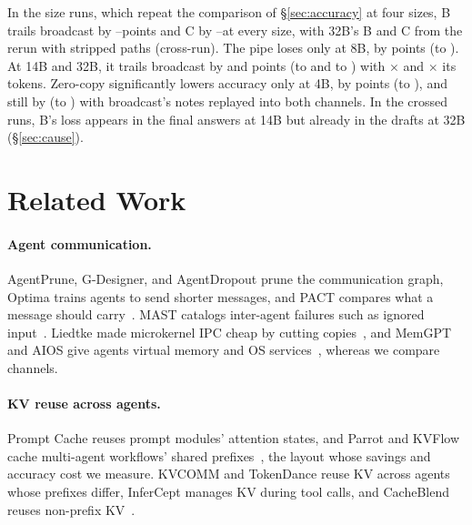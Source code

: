 \documentclass[sigplan,10pt,nonacm,review,anonymous]{acmart}
\begin{document}
In the size runs, which repeat the comparison of \S\ref{sec:accuracy} at four sizes, B trails broadcast by
\nPSizeGapBMin--\nPSizeGapBMax points and C by \nPSizeGapCMin--\nPSizeGapCMax at every size, with 32B's B and
C from the rerun with stripped paths (cross-run). The pipe loses only at 8B, by \nPSizeEightGapATwo points (\nPSizeEightGapATwoLo to
\nPSizeEightGapATwoHi). At 14B and 32B, it trails broadcast by \nPSizeFourteenGapATwo
and \nPSizeThirtyTwoGapATwo points (\nPSizeFourteenGapATwoLo to \nPSizeFourteenGapATwoHi and
\nPSizeThirtyTwoGapATwoLo to \nPSizeThirtyTwoGapATwoHi) with \nRThirteenPipeSentFourteen{}$\times$ and
\nRThirteenPipeSentThirtyTwo{}$\times$ its tokens. Zero-copy significantly lowers accuracy only at 4B,
by \nPSizeFourGapAZc points (\nPSizeFourGapAZcLo to \nPSizeFourGapAZcHi), and still by \nRFourZcReplayFour
(\nRFourZcReplayFourLo to \nRFourZcReplayFourHi) with broadcast's notes replayed into both channels. In the
crossed runs, B's loss appears in the final answers at 14B but already in the drafts at 32B
(\S\ref{sec:cause}).

\section{Related Work}

\paragraph{Agent communication.} AgentPrune, G-Designer, and AgentDropout prune the communication graph,
Optima trains agents to send shorter messages, and PACT compares what a message should
carry~\cite{agentprune,gdesigner,agentdropout,optima,pact}. MAST catalogs inter-agent failures such as ignored
input~\cite{mast}. Liedtke made microkernel IPC cheap by cutting copies~\cite{liedtke-ipc}, and
MemGPT and AIOS give agents virtual memory and OS services~\cite{memgpt,aios}, whereas we compare channels.

\paragraph{KV reuse across agents.} Prompt Cache reuses prompt modules' attention states, and Parrot and
KVFlow cache multi-agent workflows' shared prefixes~\cite{promptcache,parrot,kvflow}, the layout whose savings
and accuracy cost we measure. KVCOMM and TokenDance reuse KV across agents whose
prefixes differ, InferCept manages KV during tool calls, and CacheBlend reuses non-prefix
KV~\cite{kvcomm,tokendance,infercept,cacheblend}.
\end{document}
